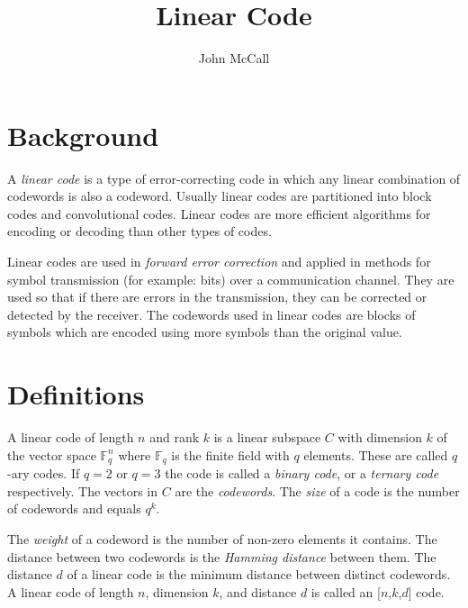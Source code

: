 \documentclass{article}
\title{Linear Code}
\author{John McCall}
\begin{document}
\maketitle

\section{Background}
A \textit{linear code} is a type of error-correcting code in which any linear
combination of codewords is also a codeword. Usually linear codes are partitioned
into block codes and convolutional codes. Linear codes are more efficient algorithms
for encoding or decoding than other types of codes.

Linear codes are used in \textit{forward error correction} and applied in
methods for symbol transmission (for example: bits) over a communication channel.
They are used so that if there are errors in the transmission, they can be corrected
or detected by the receiver. The codewords used in linear codes are blocks of
symbols which are encoded using more symbols than the original value.

\section{Definitions}
A linear code of length $n$ and rank $k$ is a linear subspace $C$ with
dimension $k$ of the vector space $\mathbb{F}^{n}_{q}$ where $\mathbb{F}_{q}$
is the finite field with $q$ elements. These are called $q$-ary codes.
If $q = 2 \text{ or } q = 3$ the code is called a \textit{binary code}, or
a \textit{ternary code} respectively. The vectors in $C$ are the \textit{codewords}. 
The \textit{size} of a code is the number of codewords and equals $q^{k}$.

The \textit{weight} of a codeword is the number of non-zero elements it contains. The
distance between two codewords is the \textit{Hamming distance} between them. The
distance $d$ of a linear code is the minimum distance between distinct codewords.
A linear code of length $n$,  dimension $k$, and distance $d$ is called an
[$n$,$k$,$d$] code.
\end{document}
